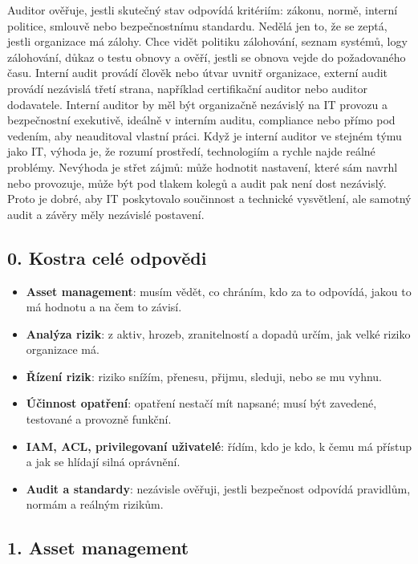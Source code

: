 \documentclass[11pt,a4paper]{article}
\begin{document}
\begin{beigebox}
Auditor ověřuje, jestli skutečný stav odpovídá kritériím: zákonu, normě, interní politice, smlouvě nebo bezpečnostnímu standardu. Nedělá jen to, že se zeptá, jestli organizace má zálohy. Chce vidět politiku zálohování, seznam systémů, logy zálohování, důkaz o testu obnovy a ověří, jestli se obnova vejde do požadovaného času. Interní audit provádí člověk nebo útvar uvnitř organizace, externí audit provádí nezávislá třetí strana, například certifikační auditor nebo auditor dodavatele. Interní auditor by měl být organizačně nezávislý na IT provozu a bezpečnostní exekutivě, ideálně v interním auditu, compliance nebo přímo pod vedením, aby neauditoval vlastní práci. Když je interní auditor ve stejném týmu jako IT, výhoda je, že rozumí prostředí, technologiím a rychle najde reálné problémy. Nevýhoda je střet zájmů: může hodnotit nastavení, které sám navrhl nebo provozuje, může být pod tlakem kolegů a audit pak není dost nezávislý. Proto je dobré, aby IT poskytovalo součinnost a technické vysvětlení, ale samotný audit a závěry měly nezávislé postavení.
\end{beigebox}

\subsection*{0. Kostra celé odpovědi}

\begin{itemize}
    \item \textbf{Asset management}: musím vědět, co chráním, kdo za to odpovídá, jakou to má hodnotu a na čem to závisí.
    \item \textbf{Analýza rizik}: z aktiv, hrozeb, zranitelností a dopadů určím, jak velké riziko organizace má.
    \item \textbf{Řízení rizik}: riziko snížím, přenesu, přijmu, sleduji, nebo se mu vyhnu.
    \item \textbf{Účinnost opatření}: opatření nestačí mít napsané; musí být zavedené, testované a provozně funkční.
    \item \textbf{IAM, ACL, privilegovaní uživatelé}: řídím, kdo je kdo, k čemu má přístup a jak se hlídají silná oprávnění.
    \item \textbf{Audit a standardy}: nezávisle ověřuji, jestli bezpečnost odpovídá pravidlům, normám a reálným rizikům.
\end{itemize}

\subsection*{1. Asset management}
\end{document}
